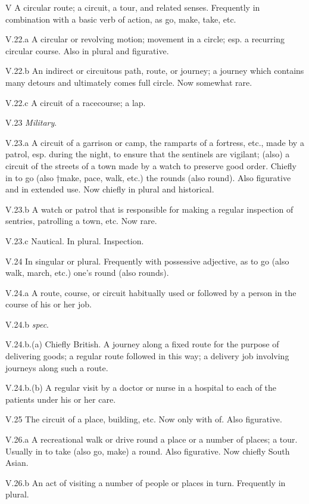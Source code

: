 \begin{compactitem}
			\item[V] A circular route; a circuit, a tour, and related senses. Frequently in combination with a basic verb of action, as go, make, take, etc.
			\item[V.22.a] A circular or revolving motion; movement in a circle; esp. a recurring circular course. Also in plural and figurative.
			\item[V.22.b] An indirect or circuitous path, route, or journey; a journey which contains many detours and ultimately comes full circle. Now somewhat rare.
			\item[V.22.c] A circuit of a racecourse; a lap.
			\item[V.23] \textit{Military}.
			\item[V.23.a] A circuit of a garrison or camp, the ramparts of a fortress, etc., made by a patrol, esp. during the night, to ensure that the sentinels are vigilant; (also) a circuit of the streets of a town made by a watch to preserve good order. Chiefly in to go (also †make, pace, walk, etc.) the rounds (also round). Also figurative and in extended use. Now chiefly in plural and historical.
			\item[V.23.b] A watch or patrol that is responsible for making a regular inspection of sentries, patrolling a town, etc. Now rare.
			\item[V.23.c] Nautical. In plural. Inspection.
			\item[V.24] In singular or plural. Frequently with possessive adjective, as to go (also walk, march, etc.) one's round (also rounds).
			\item[V.24.a] A route, course, or circuit habitually used or followed by a person in the course of his or her job. 
			\item[V.24.b] \textit{spec}.
			\item[V.24.b.(a)] Chiefly British. A journey along a fixed route for the purpose of delivering goods; a regular route followed in this way; a delivery job involving journeys along such a route.
			\item[V.24.b.(b)] A regular visit by a doctor or nurse in a hospital to each of the patients under his or her care.
			\item[V.25] The circuit of a place, building, etc. Now only with of. Also figurative.
			\item[V.26.a] A recreational walk or drive round a place or a number of places; a tour. Usually in to take (also go, make) a round. Also figurative. Now chiefly South Asian.
			\item[V.26.b] An act of visiting a number of people or places in turn. Frequently in plural.

\end{compactitem}
